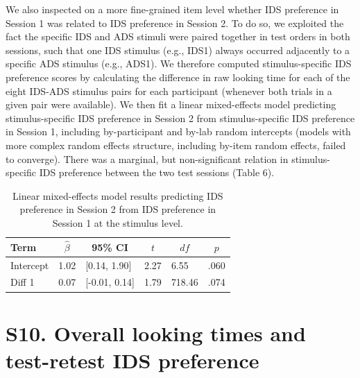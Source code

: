 \documentclass[
  man, donotrepeattitle,floatsintext]{apa6}
\begin{document}
We also inspected on a more fine-grained item level whether IDS preference in Session 1 was related to IDS preference in Session 2.
To do so, we exploited the fact the specific IDS and ADS stimuli were paired together in test orders in both sessions, such that one IDS stimulus (e.g., IDS1) always occurred adjacently to a specific ADS stimulus (e.g., ADS1).
We therefore computed stimulus-specific IDS preference scores by calculating the difference in raw looking time for each of the eight IDS-ADS stimulus pairs for each participant (whenever both trials in a given pair were available).
We then fit a linear mixed-effects model predicting stimulus-specific IDS preference in Session 2 from stimulus-specific IDS preference in Session 1, including by-participant and by-lab random intercepts (models with more complex random effects structure, including by-item random effects, failed to converge).
There was a marginal, but non-significant relation in stimulus-specific IDS preference between the two test sessions (Table 6).

\begin{table}[tbp]

\begin{center}
\begin{threeparttable}

\caption{\label{tab:unnamed-chunk-37}Linear mixed-effects model results predicting IDS preference in Session 2 from IDS preference in Session 1 at the stimulus level.}

\begin{tabular}{llllll}
\toprule
Term & \multicolumn{1}{c}{$\hat{\beta}$} & \multicolumn{1}{c}{95\% CI} & \multicolumn{1}{c}{$t$} & \multicolumn{1}{c}{$\mathit{df}$} & \multicolumn{1}{c}{$p$}\\
\midrule
Intercept & 1.02 & {}[0.14, 1.90] & 2.27 & 6.55 & .060\\
Diff 1 & 0.07 & {}[-0.01, 0.14] & 1.79 & 718.46 & .074\\
\bottomrule
\end{tabular}

\end{threeparttable}
\end{center}

\end{table}

\hypertarget{s10.-overall-looking-times-and-test-retest-ids-preference}{%
\section{S10. Overall looking times and test-retest IDS preference}\label{s10.-overall-looking-times-and-test-retest-ids-preference}}
\end{document}
